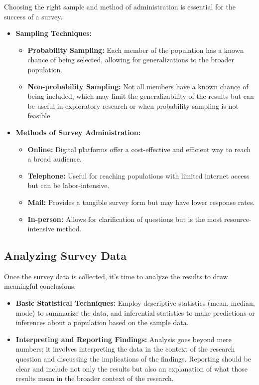 \documentclass[
]{book}
\providecommand{\tightlist}{%
  \setlength{\itemsep}{0pt}\setlength{\parskip}{0pt}}
\begin{document}
Choosing the right sample and method of administration is essential for the success of a survey.

\begin{itemize}
\tightlist
\item
  \textbf{Sampling Techniques:}

  \begin{itemize}
  \tightlist
  \item
    \textbf{Probability Sampling:} Each member of the population has a known chance of being selected, allowing for generalizations to the broader population.
  \item
    \textbf{Non-probability Sampling:} Not all members have a known chance of being included, which may limit the generalizability of the results but can be useful in exploratory research or when probability sampling is not feasible.
  \end{itemize}
\item
  \textbf{Methods of Survey Administration:}

  \begin{itemize}
  \tightlist
  \item
    \textbf{Online:} Digital platforms offer a cost-effective and efficient way to reach a broad audience.
  \item
    \textbf{Telephone:} Useful for reaching populations with limited internet access but can be labor-intensive.
  \item
    \textbf{Mail:} Provides a tangible survey form but may have lower response rates.
  \item
    \textbf{In-person:} Allows for clarification of questions but is the most resource-intensive method.
  \end{itemize}
\end{itemize}

\hypertarget{analyzing-survey-data}{%
\subsection*{Analyzing Survey Data}\label{analyzing-survey-data}}

Once the survey data is collected, it's time to analyze the results to draw meaningful conclusions.

\begin{itemize}
\item
  \textbf{Basic Statistical Techniques:} Employ descriptive statistics (mean, median, mode) to summarize the data, and inferential statistics to make predictions or inferences about a population based on the sample data.
\item
  \textbf{Interpreting and Reporting Findings:} Analysis goes beyond mere numbers; it involves interpreting the data in the context of the research question and discussing the implications of the findings. Reporting should be clear and include not only the results but also an explanation of what those results mean in the broader context of the research.
\end{itemize}
\end{document}
